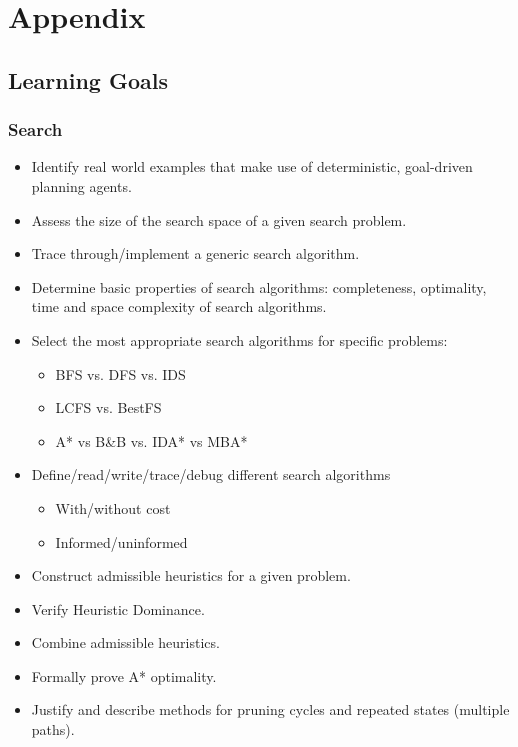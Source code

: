 \documentclass{article}
\begin{document}
\section{Appendix}

\subsection{Learning Goals}

\subsubsection*{Search}

\begin{itemize}
    \item Identify real world examples that make use of deterministic, goal-driven planning agents.
    \item Assess the size of the search space of a given search problem.
    \item Trace through/implement a generic search algorithm.
    \item Determine basic properties of search algorithms: completeness, optimality, time and space complexity of search algorithms.
    \item Select the most appropriate search algorithms for specific problems:
        \begin{itemize}
            \item BFS vs. DFS vs. IDS
            \item LCFS vs. BestFS
            \item A* vs B\&B vs. IDA* vs MBA*
        \end{itemize}
    \item Define/read/write/trace/debug different search algorithms
        \begin{itemize}
            \item With/without cost
            \item Informed/uninformed
        \end{itemize}
    \item Construct admissible heuristics for a given problem.
    \item Verify Heuristic Dominance.
    \item Combine admissible heuristics.
    \item Formally prove A* optimality.
    \item Justify and describe methods for pruning cycles and repeated states (multiple paths).
\end{itemize}
\end{document}

